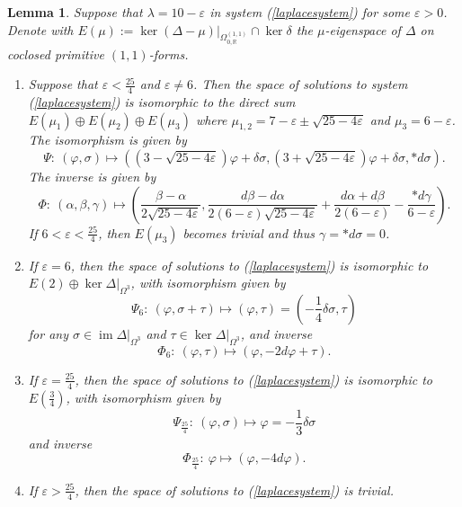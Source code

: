 \documentclass[12pt]{scrartcl}
\theoremstyle{plain}
\newtheorem{lem}[satz]{Lemma}
\theoremstyle{definition}
\newcommand{\R}{\mathbb{R}}%
\newcommand{\im}{\operatorname{im}}%
\begin{document}
\begin{lem}\label{epsilon}
Suppose that $\lambda=10-\varepsilon$ in system {\upshape (\ref{laplacesystem})} for some $\varepsilon>0$. Denote with $E(\mu):=\ker(\Delta-\mu)\big|_{\Omega^{(1,1)}_{0,\R}}\cap\ker\delta$ the $\mu$-eigenspace of $\Delta$ on coclosed primitive $(1,1)$-forms.
\begin{enumerate}[\upshape (i)]
 \item Suppose that $\varepsilon<\frac{25}{4}$ and $\varepsilon\neq6$. Then the space of solutions to system {\upshape (\ref{laplacesystem})} is isomorphic to the direct sum $E(\mu_1)\oplus E(\mu_2)\oplus E(\mu_3)$ where $\mu_{1,2}=7-\varepsilon\pm\sqrt{25-4\varepsilon}$ and $\mu_3=6-\varepsilon$. The isomorphism is given by
\[\Psi:\ (\varphi,\sigma)\mapsto((3-\sqrt{25-4\varepsilon})\varphi+\delta\sigma,(3+\sqrt{25-4\varepsilon})\varphi+\delta\sigma,\ast d\sigma).\]
The inverse is given by
\[\Phi:\ (\alpha,\beta,\gamma)\mapsto\left(\frac{\beta-\alpha}{2\sqrt{25-4\varepsilon}},\frac{d\beta-d\alpha}{2(6-\varepsilon)\sqrt{25-4\varepsilon}}+\frac{d\alpha+d\beta}{2(6-\varepsilon)}-\frac{\ast d\gamma}{6-\varepsilon}\right).\]
If $6<\varepsilon<\frac{25}{4}$, then $E(\mu_3)$ becomes trivial and thus $\gamma=\ast d\sigma=0$.
 \item If $\varepsilon=6$, then the space of solutions to {\upshape (\ref{laplacesystem})} is isomorphic to $E(2)\oplus\ker\Delta\big|_{\Omega^3}$, with isomorphism given by
\[\Psi_6:\ (\varphi,\sigma+\tau)\mapsto(\varphi,\tau)=\left(-\frac{1}{4}\delta\sigma,\tau\right)\]
for any $\sigma\in\im\Delta\big|_{\Omega^3}$ and $\tau\in\ker\Delta\big|_{\Omega^3}$, and inverse
\[\Phi_6:\ (\varphi,\tau)\mapsto\left(\varphi,-2d\varphi+\tau\right).\]
 \item If $\varepsilon=\frac{25}{4}$, then the space of solutions to {\upshape (\ref{laplacesystem})} is isomorphic to $E(\frac{3}{4})$, with isomorphism given by
\[\Psi_\frac{25}{4}:\ (\varphi,\sigma)\mapsto \varphi=-\frac{1}{3}\delta\sigma\]
and inverse
\[\Phi_\frac{25}{4}:\ \varphi\mapsto\left(\varphi,-4d\varphi\right).\]
 \item If $\varepsilon>\frac{25}{4}$, then the space of solutions to {\upshape (\ref{laplacesystem})} is trivial.
\end{enumerate}
\end{lem}
\end{document}
